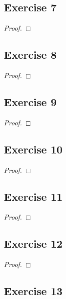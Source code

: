 \documentclass[14pt]{extarticle}
\begin{document}
\subsection{Exercise 7}

\begin{proof}

\end{proof}

\subsection{Exercise 8}

\begin{proof}

\end{proof}

\subsection{Exercise 9}

\begin{proof}

\end{proof}

\subsection{Exercise 10}

\begin{proof}

\end{proof}

\subsection{Exercise 11}

\begin{proof}

\end{proof}

\subsection{Exercise 12}

\begin{proof}

\end{proof}

\subsection{Exercise 13}
\end{document}
